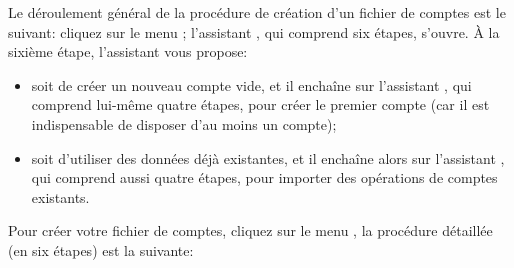 Le déroulement général de la procédure de création d'un fichier de comptes est le suivant: cliquez sur le menu ; l'assistant , qui comprend six étapes, s'ouvre. À la sixième étape, l'assistant vous propose:

\begin{itemize}
	\item  soit de créer un nouveau compte vide, et il enchaîne sur l'assistant , qui comprend lui-même quatre étapes, pour créer le premier compte (car il est indispensable de disposer d'au moins un compte);
	\item soit d'utiliser des données déjà existantes, et il enchaîne alors sur l'assistant , qui comprend aussi quatre étapes, pour importer des opérations de comptes existants.
\end{itemize}

Pour créer votre fichier de comptes, cliquez sur le menu , la procédure détaillée (en six étapes) est la suivante:

